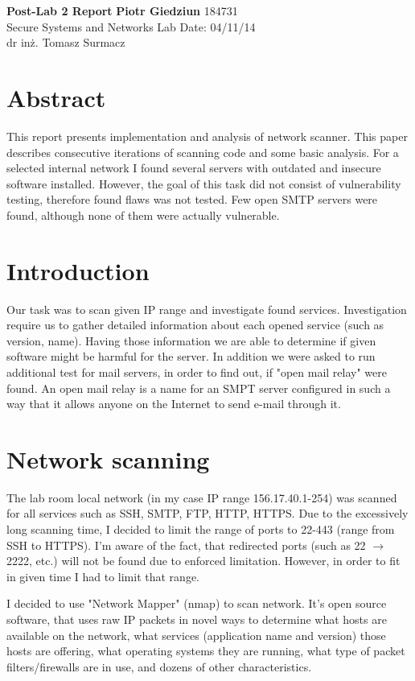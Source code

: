 \documentclass[a4paper, 11pt]{article}
\begin{document}
\noindent
\large\textbf{Post-Lab 2 Report} \hfill \textbf{Piotr Giedziun} 184731\\
\normalsize Secure Systems and Networks \hfill  Lab Date: 04/11/14 \\
dr inż. Tomasz Surmacz

\section*{Abstract}
This report presents implementation and analysis of network scanner. This paper describes consecutive iterations of scanning code and some basic analysis.
For a selected internal network I found several servers with outdated and insecure software installed. However, the goal of this task did not consist of vulnerability testing, therefore found flaws was not tested. Few open SMTP servers were found, although none of them were actually vulnerable.

\section*{Introduction}
Our task was to scan given IP range and investigate found services. Investigation require us to gather detailed information about each opened service (such as version, name). Having those information we are able to determine if given software might be harmful for the server. 
In addition we were asked to run additional test for mail servers, in order to find out, if "open mail relay" were found.
An open mail relay is a name for an SMPT server configured in such a way that it allows anyone on the Internet to send e-mail through it.

\section*{Network scanning}

The lab room local network (in my case IP range 156.17.40.1-254) was scanned for all services such as SSH, SMTP, FTP, HTTP, HTTPS.
Due to the excessively long scanning time, I decided to limit the range of ports to 22-443 (range from SSH to HTTPS).
I'm aware of the fact, that redirected ports (such as 22 $\rightarrow$ 2222, etc.) will not be found due to enforced limitation. However, in order to fit in given time I had to limit that range.

I decided to use "Network Mapper" (nmap) to scan network. It's open source software, that uses raw IP packets in novel ways to determine what hosts are available on the network, what services (application name and version) those hosts are offering, what operating systems they are running, what type of packet filters/firewalls are in use, and dozens of other characteristics.
\end{document}
